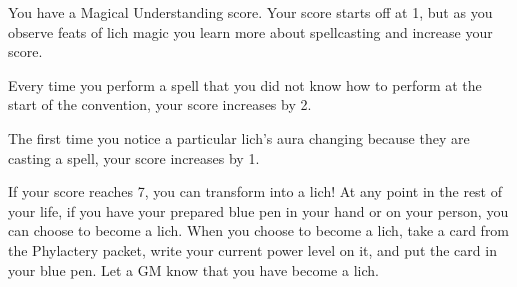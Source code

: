 \documentclass[green]{Sel}
\begin{document}
\name{\gCarminisMagicalUnderstanding{}}

You have a Magical Understanding score. Your score starts off at 1, but as you observe feats of lich magic you learn more about spellcasting and increase your score.

Every time you perform a spell that you did not know how to perform at the start of the convention, your score increases by 2.

The first time you notice a particular lich’s aura changing because they are casting a spell, your score increases by 1.

If your score reaches 7, you can transform into a lich! At any point in the rest of your life, if you have your prepared blue pen in your hand or on your person, you can choose to become a lich. When you choose to become a lich, take a card from the Phylactery packet, write your current power level on it, and put the card in your blue pen. Let a GM know that you have become a lich.
\end{document}
